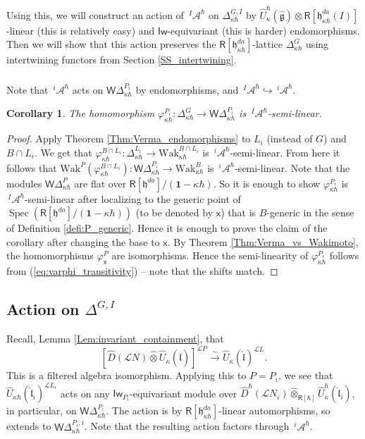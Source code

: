 \documentclass{amsart}
\newtheorem{Cor}[Thm]{Corollary}
\theoremstyle{definition}
\newcommand{\sss}{\subsubsection{}}
\newcommand{\on}{\mathrm}
\newcommand{\Ring}{\mathsf{R}}
\newcommand{\hg}{\hat{\mathfrak{g}}}
\newcommand{\h}{\mathfrak{h}}
\newcommand{\Wak}{\on{Wak}}
\newcommand{\lf}{\mathfrak{l}}
\newcommand{\A}{\mathscr{A}}
\newcommand{\Loop}{\mathscr{L}}
\newcommand{\bone}{\mathbf{1}}
\newcommand{\Iw}{\mathsf{Iw}}
\newcommand{\WakDelta}{\mathsf{W}\Delta}
\newcommand{\sx}{\mathsf{x}}
\numberwithin{equation}{section}
\begin{document}
Using this, we will construct an action of $\,^I\!\A^\hbar$ on $\Delta^{G,I}_{\kappa\hbar}$
by $\widehat{U}^\hbar_\kappa(\hg)\otimes \Ring[\h^{da}_{\kappa\hbar}(I)]$-linear (this is relatively easy)
and $\Iw$-equivariant (this is harder) endomorphisms. Then we will show that this action preserves the $\Ring[\h^{da}_{\kappa\hbar}]$-lattice $\Delta^{G}_{\kappa\hbar}$ using intertwining functors from Section \ref{SS_intertwining}. 

\sss %
Note that $\,^i\!\A^\hbar$
acts on $\WakDelta_{\kappa\hbar}^{P_i}$ by endomorphisms, and $\,^I\!\A^\hbar\hookrightarrow \,^i\!\A^\hbar$. 
 
\begin{Cor}\label{Cor:Verma_endomorphisms}
The homomorphism $\varphi_{\kappa\hbar}^{P_i}:\Delta^{G}_{\kappa\hbar}\rightarrow 
\WakDelta^{P_i}_{\kappa\hbar}$ is $\,^I\!\A^\hbar$-semi-linear. 
\end{Cor}
\begin{proof}
Apply Theorem \ref{Thm:Verma_endomorphisms} to $L_i$ (instead of $G$) and $B\cap L_i$. We get that $\varphi_{\kappa\hbar}^{B\cap L_i}: \Delta^{L_i}_{\kappa\hbar}\rightarrow \Wak^{B\cap L_i}_{\kappa\hbar}$ is 
$\,^i\!\A^\hbar$-semi-linear. From here it follows that  $\Wak^P(\varphi_{\kappa\hbar}^{B\cap L_i}): \WakDelta^{P_i}_{\kappa\hbar}\rightarrow \Wak^B_{\kappa\hbar}$ is $\,^i\!\A^\hbar$-semi-linear. Note that the modules $\WakDelta^{P}_{\kappa\hbar}$ are flat over $\Ring[\h^{da}]/(\bone-\kappa \hbar)$.  So it is enough to show $\varphi_{\kappa\hbar}^{P_i}$ is $\,^I\!\A^\hbar$-semi-linear after localizing to the generic point of $\operatorname{Spec}(\Ring[\h^{da}]/(\bone-\kappa \hbar))$ (to be denoted by $\sx$) that is $B$-generic in the sense of Definition \ref{defi:P_generic}. Hence it is enough to prove the claim of the corollary after changing the base to $\sx$. By Theorem \ref{Thm:Verma_vs_Wakimoto}, the homomorphisms $\varphi_{\sx}^P$ are isomorphisms. Hence the semi-linearity of $\varphi_{\kappa\hbar}^{P_i}$ follows from (\ref{eq:varphi_transitivity}) -- note that the shifts match. 
\end{proof}

\subsection{Action on $\Delta^{G,I}$}
Recall, Lemma \ref{Lem:invariant_containment}, that 
$$[\widehat{D}(\Loop N)\widehat{\otimes}\widehat{U}_\kappa(\hat{\lf})]^{\Loop P}\xrightarrow{\sim}\widehat{U}_\kappa(\hat{\lf})^{\Loop L}.$$
This is a filtered algebra isomorphism. 
Applying this to $P=P_i$, we see that $\widehat{U}_{\kappa\hbar}(\hat{\lf}_i)^{\Loop L_i}$ acts on any $\Iw_{P_i}$-equivariant module over 
$\widehat{D}^\hbar(\Loop N_i)\widehat{\otimes}_{\Ring[\hbar]}\widehat{U}^\hbar_{\kappa}(\hat{\lf}_i)$, in particular, on $\WakDelta^{P_i}_{\kappa\hbar}$. The action is by $\Ring[\h^{da}_{\kappa\hbar}]$-linear automorphisms, so extends to $\WakDelta^{P_i,i}_{\kappa\hbar}$. Note that the resulting action factors through $\,^i\!\A^\hbar$. 
\end{document}
